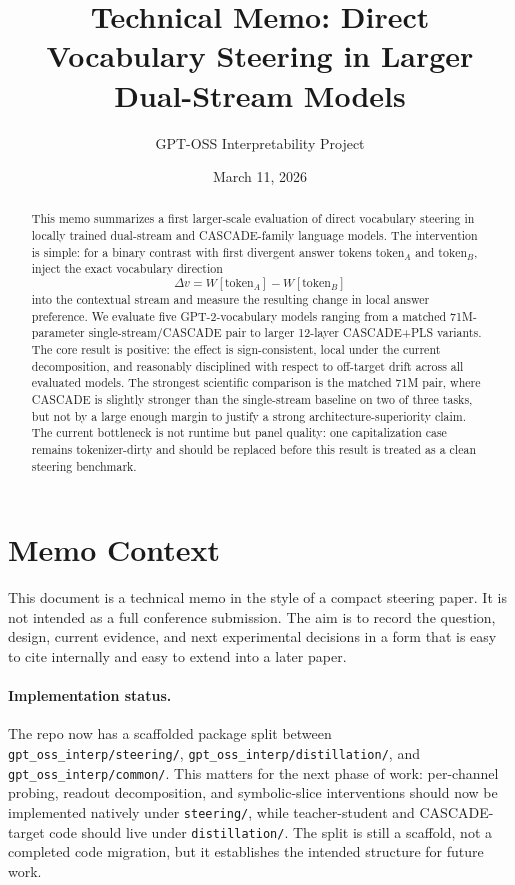 \documentclass[11pt]{article}
\title{Technical Memo: Direct Vocabulary Steering in Larger Dual-Stream Models}
\author{GPT-OSS Interpretability Project}
\date{March 11, 2026}
\begin{document}
\maketitle

\begin{abstract}
This memo summarizes a first larger-scale evaluation of direct vocabulary
steering in locally trained dual-stream and CASCADE-family language models.
The intervention is simple: for a binary contrast with first divergent answer
tokens $\text{token}_A$ and $\text{token}_B$, inject the exact vocabulary
direction
\[
\Delta v = W[\text{token}_A] - W[\text{token}_B]
\]
into the contextual stream and measure the resulting change in local answer
preference. We evaluate five GPT-2-vocabulary models ranging from a matched
71M-parameter single-stream/CASCADE pair to larger 12-layer CASCADE+PLS
variants. The core result is positive: the effect is sign-consistent, local
under the current decomposition, and reasonably disciplined with respect to
off-target drift across all evaluated models. The strongest scientific
comparison is the matched 71M pair, where CASCADE is slightly stronger than the
single-stream baseline on two of three tasks, but not by a large enough margin
to justify a strong architecture-superiority claim. The current bottleneck is
not runtime but panel quality: one capitalization case remains tokenizer-dirty
and should be replaced before this result is treated as a clean steering
benchmark.
\end{abstract}

\section{Memo Context}

This document is a technical memo in the style of a compact steering paper. It
is not intended as a full conference submission. The aim is to record the
question, design, current evidence, and next experimental decisions in a form
that is easy to cite internally and easy to extend into a later paper.

\paragraph{Implementation status.}
The repo now has a scaffolded package split between
\texttt{gpt\_oss\_interp/steering/},
\texttt{gpt\_oss\_interp/distillation/}, and
\texttt{gpt\_oss\_interp/common/}. This matters for the next phase of work:
per-channel probing, readout decomposition, and symbolic-slice interventions
should now be implemented natively under \texttt{steering/}, while
teacher-student and CASCADE-target code should live under
\texttt{distillation/}. The split is still a scaffold, not a completed code
migration, but it establishes the intended structure for future work.
\end{document}
